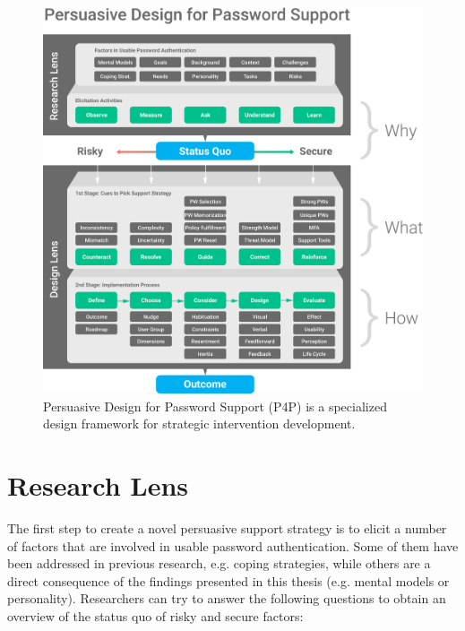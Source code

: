 
%
%
\begin{figure}[!htbp]
	\centering
	\includegraphics[width=\linewidth]{figures/pst/PerdesPassup}
	\caption{\label{fig:p4p:passup} Persuasive Design for Password Support (P4P) is a specialized design framework for strategic intervention development.}
\end{figure}

%
%
\section{Research Lens}
The first step to create a novel persuasive support strategy is to elicit a number of factors that are involved in usable password authentication. Some of them have been addressed in previous research, e.g. coping strategies, while others are a direct consequence of the findings presented in this thesis (e.g. mental models or personality). 
Researchers can try to answer the following questions to obtain an overview of the status quo of risky and secure factors:

